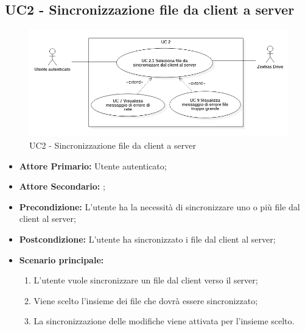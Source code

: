 \subsection{UC2 - Sincronizzazione file da client a server}
\begin{figure}[H]
    \centering
    \includegraphics[scale = 0.6]{components/img/UC2.png}
    \caption{UC2 - Sincronizzazione file da client a server}
\end{figure}
\begin{itemize}
\item \textbf{Attore Primario:} Utente autenticato;
\item \textbf{Attore Secondario:} ;
\item \textbf{Precondizione:} L'utente ha la necessità di sincronizzare uno o più file dal client al server;
\item \textbf{Postcondizione:} L'utente ha sincronizzato i file dal client al server;
\item \textbf{Scenario principale:}
\begin{enumerate}
\item L'utente vuole sincronizzare un file dal client verso il server;
\item Viene scelto l'insieme dei file che dovrà essere sincronizzato;
\item La sincronizzazione delle modifiche viene attivata per l'insieme scelto.
\end{enumerate}
\end{itemize}

